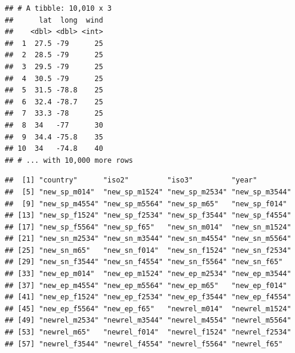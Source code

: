 \documentclass[]{article}
\newenvironment{Shaded}{\begin{snugshade}}{\end{snugshade}}
\newcommand{\CommentTok}[1]{\textcolor[rgb]{0.56,0.35,0.01}{\textit{#1}}}
\newcommand{\KeywordTok}[1]{\textcolor[rgb]{0.13,0.29,0.53}{\textbf{#1}}}
\newcommand{\NormalTok}[1]{#1}
\newcommand{\OperatorTok}[1]{\textcolor[rgb]{0.81,0.36,0.00}{\textbf{#1}}}
\newcommand{\StringTok}[1]{\textcolor[rgb]{0.31,0.60,0.02}{#1}}
\begin{document}
\begin{Shaded}
\end{Shaded}

\begin{verbatim}
## # A tibble: 10,010 x 3
##      lat  long  wind
##    <dbl> <dbl> <int>
##  1  27.5 -79      25
##  2  28.5 -79      25
##  3  29.5 -79      25
##  4  30.5 -79      25
##  5  31.5 -78.8    25
##  6  32.4 -78.7    25
##  7  33.3 -78      25
##  8  34   -77      30
##  9  34.4 -75.8    35
## 10  34   -74.8    40
## # ... with 10,000 more rows
\end{verbatim}

\begin{Shaded}
\end{Shaded}

\begin{verbatim}
##  [1] "country"      "iso2"         "iso3"         "year"        
##  [5] "new_sp_m014"  "new_sp_m1524" "new_sp_m2534" "new_sp_m3544"
##  [9] "new_sp_m4554" "new_sp_m5564" "new_sp_m65"   "new_sp_f014" 
## [13] "new_sp_f1524" "new_sp_f2534" "new_sp_f3544" "new_sp_f4554"
## [17] "new_sp_f5564" "new_sp_f65"   "new_sn_m014"  "new_sn_m1524"
## [21] "new_sn_m2534" "new_sn_m3544" "new_sn_m4554" "new_sn_m5564"
## [25] "new_sn_m65"   "new_sn_f014"  "new_sn_f1524" "new_sn_f2534"
## [29] "new_sn_f3544" "new_sn_f4554" "new_sn_f5564" "new_sn_f65"  
## [33] "new_ep_m014"  "new_ep_m1524" "new_ep_m2534" "new_ep_m3544"
## [37] "new_ep_m4554" "new_ep_m5564" "new_ep_m65"   "new_ep_f014" 
## [41] "new_ep_f1524" "new_ep_f2534" "new_ep_f3544" "new_ep_f4554"
## [45] "new_ep_f5564" "new_ep_f65"   "newrel_m014"  "newrel_m1524"
## [49] "newrel_m2534" "newrel_m3544" "newrel_m4554" "newrel_m5564"
## [53] "newrel_m65"   "newrel_f014"  "newrel_f1524" "newrel_f2534"
## [57] "newrel_f3544" "newrel_f4554" "newrel_f5564" "newrel_f65"
\end{verbatim}
\end{document}
